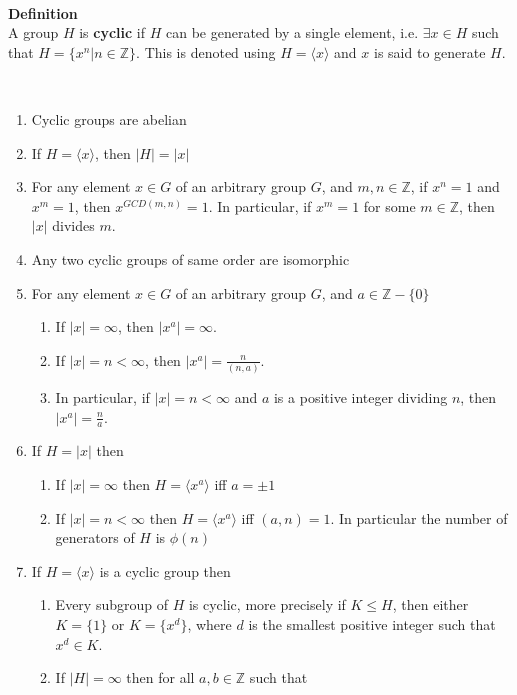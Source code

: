 \documentclass[titlepage, 12pt]{article}
\newenvironment{definition}[1][Definition]
    {\leavevmode \\ \begin{mdframed}[backgroundcolor=gray!20] \textbf{#1} \\}
    {  \end{mdframed}\leavevmode \\}
\begin{document}
\begin{definition}
    A group $H$ is \textbf{cyclic} if $H$ can be generated by a single element,
    i.e. $\exists x\in H$ such that $H = \{x^n| n\in \mathbb{Z}\}$. This is denoted
    using $H = \langle x\rangle$ and $x$ is said to generate $H$.
\end{definition}
\begin{enumerate}
    \item Cyclic groups are abelian
    \item If $H = \langle x\rangle$, then $| H| = | x|$
    \item For any element $x\in G$ of an arbitrary group $G$, and $m, n\in
        \mathbb{Z}$,
        if $x^n = 1$ and $x^m = 1$, then $x^{GCD(m, n)} = 1$. In particular, if
        $x^m = 1$ for some $m\in \mathbb{Z}$, then $|x|$ divides $m$.
    \item Any two cyclic groups of same order are isomorphic
    \item For any element $x\in G$ of an arbitrary group $G$, and $a\in
        \mathbb{Z} - \{0\}$
        \begin{enumerate}
            \item If $|x| = \infty$, then $|x^a| = \infty$.
            \item If $|x| = n < \infty$, then $|x^a| = \frac{n}{(n, a)}$.
            \item In particular, if $|x| = n < \infty$ and $a$ is a positive integer
                dividing $n$, then $|x^a| = \frac{n}{a}$.
        \end{enumerate}
    \item If $H = |x|$ then
        \begin{enumerate}
            \item If $|x| = \infty$ then $H = \langle x^a\rangle$ iff $a =
                \pm 1$
            \item If $|x| = n < \infty$ then $H = \langle x^a\rangle$ iff $(a, n) =
                1$. In particular the number of generators of $H$ is $\phi(n)$
        \end{enumerate}
    \item If $H = \langle x\rangle$ is a cyclic group then
        \begin{enumerate}
            \item Every subgroup of $H$ is cyclic, more precisely if $K\le H$,
                then either $K = \{1\}$ or $K = \{x^d\}$, where $d$ is the
                smallest positive integer such that $x^d\in K$.
            \item If $|H| = \infty$ then for all $a, b\in\mathbb{Z}$ such that

\end{enumerate}
\end{enumerate}
\end{document}
